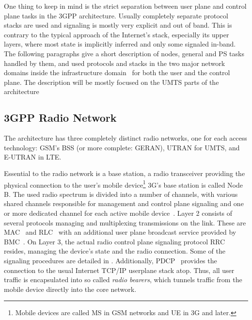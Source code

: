 One thing to keep in mind is the strict separation between user plane and control plane tasks in the \gls{3GPP} architecture. Usually completely separate protocol stacks are used and signaling is mostly very explicit and out of band. This is contrary to the typical approach of the Internet's stack, especially its upper layers, where most state is implicitly inferred and only some signaled in-band. The following paragraphs give a short description of nodes, general and \gls{PS} tasks handled by them, and used protocols and stacks in the two major network domains inside the infrastructure domain~\cite{3gpp.23.101} for both the user and the control plane. The description will be mostly focused on the \gls{UMTS} parts of the architecture


\subsection{\texorpdfstring{\acrshort{3GPP}}{3GPP} Radio Network}

The architecture has three completely distinct radio networks, one for each access technology: \gls{GSM}'s \gls{BSS} (or more complete: \gls{GERAN}), \gls{UTRAN} for \gls{UMTS}, and \gls{E-UTRAN} in \gls{LTE}.

Essential to the radio network is a base station, a radio transceiver providing the physical connection to the user's mobile device\footnote{Mobile devices are called \gls{MS} in \gls{GSM} networks and \gls{UE} in 3G and later.} 3G's base station is called Node B. The used radio spectrum is divided into a number of channels, with various shared channels responsible for management and control plane signaling and one or more dedicated channel for each active mobile device~\cite{3gpp.25.201,3gpp.25.301}. Layer 2 consists of several protocols managing and multiplexing transmissions on the link. These are \gls{MAC}~\cite{3gpp.25.321} and \gls{RLC}~\cite{3gpp.25.322} with an additional user plane broadcast service provided by \gls{BMC}~\cite{3gpp.25.324}. On Layer 3, the actual radio control plane signaling protocol \gls{RRC}~\cite{3gpp.25.331} resides, managing the device's state and the radio connection. Some of the signaling procedures are detailed in \cite{3gpp.25.931}. Additionally, \gls{PDCP}~\cite{3gpp.25.323} provides the connection to the  usual Internet TCP/IP userplane stack atop. Thus, all user traffic is encapsulated into so called \textit{radio bearers}, which tunnels traffic from the mobile device directly into the core network.

